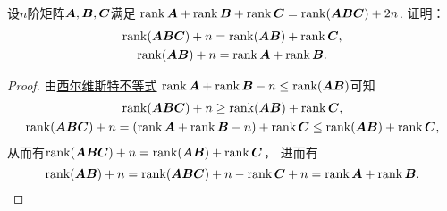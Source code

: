 \begin{example}
设\(n\)阶矩阵\(\boldsymbol{A},\boldsymbol{B},\boldsymbol{C}\)满足
\(\rank\boldsymbol{A} + \rank\boldsymbol{B} + \rank\boldsymbol{C} = \rank(\boldsymbol{A}\boldsymbol{B}\boldsymbol{C}) + 2n\).
证明：\begin{gather*}
	\rank(\boldsymbol{A}\boldsymbol{B}\boldsymbol{C}) + n = \rank(\boldsymbol{A}\boldsymbol{B}) + \rank\boldsymbol{C}, \\
	\rank(\boldsymbol{A}\boldsymbol{B}) + n = \rank\boldsymbol{A} + \rank\boldsymbol{B}.
\end{gather*}
\begin{proof}
由\hyperref[equation:线性方程组.西尔维斯特不等式]{西尔维斯特不等式}
\(\rank\boldsymbol{A} + \rank\boldsymbol{B} - n \leq \rank(\boldsymbol{A}\boldsymbol{B})\)可知\begin{gather*}
	\rank(\boldsymbol{A}\boldsymbol{B}\boldsymbol{C}) + n
	\geq \rank(\boldsymbol{A}\boldsymbol{B}) + \rank\boldsymbol{C}, \\
	\rank(\boldsymbol{A}\boldsymbol{B}\boldsymbol{C}) + n
	= (\rank\boldsymbol{A} + \rank\boldsymbol{B} - n) + \rank\boldsymbol{C}
	\leq \rank(\boldsymbol{A}\boldsymbol{B}) + \rank\boldsymbol{C},
\end{gather*}
从而有\(\rank(\boldsymbol{A}\boldsymbol{B}\boldsymbol{C}) + n = \rank(\boldsymbol{A}\boldsymbol{B}) + \rank\boldsymbol{C}\)，
进而有\begin{equation*}
	\rank(\boldsymbol{A}\boldsymbol{B}) + n
	= \rank(\boldsymbol{A}\boldsymbol{B}\boldsymbol{C}) + n - \rank\boldsymbol{C} + n
	= \rank\boldsymbol{A} + \rank\boldsymbol{B}.
	\qedhere
\end{equation*}
\end{proof}
\end{example}

